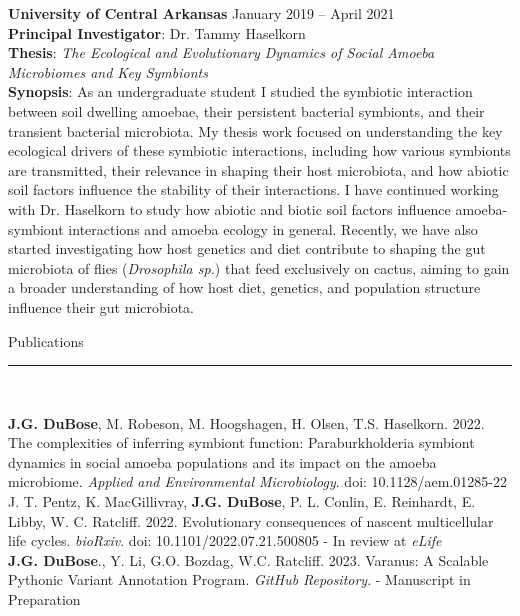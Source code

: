 \documentclass{article}
\begin{document}
\noindent \textbf{University of Central Arkansas} \hfill January 2019 – April 2021\\
\textbf{Principal Investigator}: Dr. Tammy Haselkorn\\
\textbf{Thesis}: \emph{The Ecological and Evolutionary Dynamics of Social Amoeba Microbiomes and Key Symbionts} \\
\textbf{Synopsis}: As an undergraduate student I studied the symbiotic interaction between soil dwelling amoebae, their persistent bacterial symbionts, 
and their transient bacterial microbiota. My thesis work focused on understanding the key ecological drivers of these symbiotic interactions, 
including how various symbionts are transmitted, their relevance in shaping their host microbiota, and how abiotic soil factors influence the stability of their interactions. 
I have continued working with Dr. Haselkorn to study how abiotic and biotic soil factors influence amoeba-symbiont interactions and amoeba ecology in general. 
Recently, we have also started investigating how host genetics and diet contribute to shaping the gut microbiota of flies (\emph{Drosophila sp.}) 
that feed exclusively on cactus, aiming to gain a broader understanding of how host diet, genetics, and population structure influence their gut microbiota.\\

\begin{flushleft}
{\Large Publications} \rule{16.51cm}{0.4pt}\\
\end{flushleft}
\hangindent=0.7cm \textbf{J.G. DuBose}, M. Robeson, M. Hoogshagen, H. Olsen, T.S. Haselkorn. 2022. The complexities of inferring symbiont function: Paraburkholderia symbiont dynamics in social amoeba populations and its impact on the amoeba microbiome. \emph{Applied and Environmental Microbiology}. doi: 10.1128/aem.01285-22 \\

\hangindent=0.7cm J. T. Pentz, K. MacGillivray, \textbf{J.G. DuBose}, P. L. Conlin, E. Reinhardt, E. Libby, W. C. Ratcliff. 2022. Evolutionary consequences of nascent multicellular life cycles. \emph{bioRxiv}. doi: 10.1101/2022.07.21.500805 - In review at \emph{eLife} \\

\hangindent=0.7cm \textbf{J.G. DuBose}., Y. Li, G.O. Bozdag, W.C. Ratcliff. 2023. Varanus: A Scalable Pythonic Variant Annotation Program. \emph{GitHub Repository}. - Manuscript in Preparation \\
\end{document}
